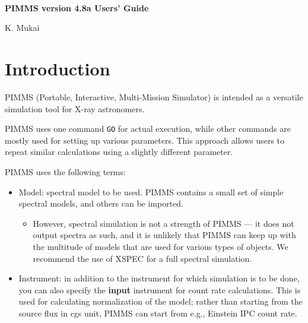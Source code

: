 %
\setlength{\parindent}{1 cm}
\setlength{\parskip}{\baselineskip}
\setlength{\textwidth}{16.5 cm}
\setlength{\textheight}{22.5 cm}
\setlength{\topmargin}{0.0 cm}
\setlength{\oddsidemargin}{0.0 cm}
\setlength{\evensidemargin}{0.0 cm}
\setlength{\headsep}{0.0 cm}
%
\raggedright
%
\def\chisq{$\chi^2$}
\def\etal{{\sl et al.\/}\ }
\def\kms{$\,$km$\,$s$^{-1}$}
\def\sqig{$\sim$}
\def\sun{$_\odot$}
\def\ergs{$\,$erg$\,$s$^{-1}$}
\def\espc{$\,$erg$\,$s$^{-1}$\,$pc$^{-3}$}
%

%
\

\vspace{0.5 cm}
\begin{centering}

{\Large\bf
PIMMS version 4.8a Users' Guide \\
}

\vspace{0.5 cm}

{\Large

K. Mukai \\

}

\end{centering}

\section{Introduction}

PIMMS (Portable, Interactive, Multi-Mission Simulator) is intended
as a versatile simulation tool for X-ray astronomers.

PIMMS uses one command {\tt GO} for actual execution, while other commands
are mostly used for setting up various parameters.  This approach allows
users to repeat similar calculations using a slightly different parameter.

PIMMS uses the following terms:

\begin{itemize}
\item Model: spectral model to be used.  PIMMS contains a small set of
simple spectral models, and others can be imported.
	\begin{itemize}
	\item However, spectral simulation is not a strength of PIMMS
	--- it does not output spectra as such, and it is unlikely that
	PIMMS can keep up with the multitude of models that are used for
	various types of objects.  We recommend
	the use of XSPEC for a full spectral simulation.
	\end{itemize}
\item Instrument: in addition to the instrument for which simulation is
to be done, you can also specify the {\bf input} instrument
for count rate calculations.
This is used for calculating normalization of the model; rather
than starting from the source flux in cgs unit, PIMMS can start from e.g.,
Einstein IPC count rate.  
\end{itemize}

